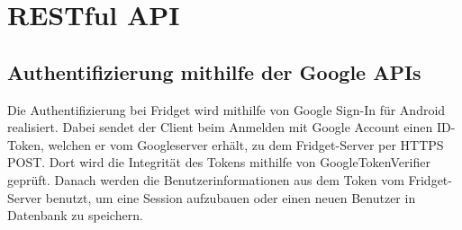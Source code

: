 \documentclass[a4paper]{scrreprt}
\begin{document}
    \chapter{RESTful API}
    \section{Authentifizierung mithilfe der Google APIs}
    Die Authentifizierung bei Fridget wird mithilfe von Google Sign-In für Android realisiert. Dabei sendet der Client beim Anmelden mit Google Account einen ID-Token, welchen er vom Googleserver erhält, zu dem Fridget-Server per HTTPS POST. Dort wird die Integrität des Tokens mithilfe von GoogleTokenVerifier geprüft. Danach werden die Benutzerinformationen aus dem Token vom Fridget-Server benutzt, um eine Session aufzubauen oder einen neuen Benutzer in Datenbank zu speichern.
    
    \newpage
\end{document}
